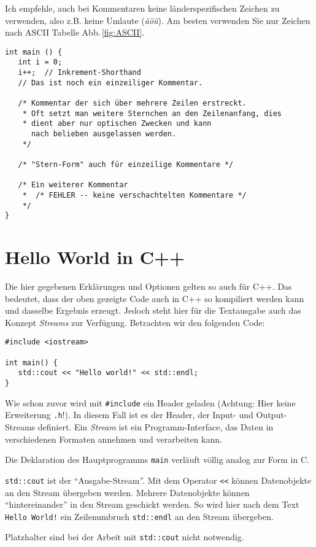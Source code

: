 Ich empfehle, auch bei Kommentaren keine länderspezifischen Zeichen zu verwenden, also z.B. keine Umlaute (\emph{äöü}). Am besten verwenden Sie nur Zeichen nach ASCII Tabelle Abb.\,\ref{fig:ASCII}.

\begin{codebox}
\begin{verbatim}
int main () {
   int i = 0;
   i++;  // Inkrement-Shorthand
   // Das ist noch ein einzeiliger Kommentar.

   /* Kommentar der sich über mehrere Zeilen erstreckt.
    * Oft setzt man weitere Sternchen an den Zeilenanfang, dies
    * dient aber nur optischen Zwecken und kann
      nach belieben ausgelassen werden.
    */

   /* "Stern-Form" auch für einzeilige Kommentare */

   /* Ein weiterer Kommentar
    *  /* FEHLER -- keine verschachtelten Kommentare */
    */
}
\end{verbatim}
\end{codebox}

\section{Hello World in C++}
\begin{plusbox}
Die hier gegebenen Erklärungen und Optionen gelten so auch für C++. Das bedeutet, dass der oben gezeigte Code auch in C++ so kompiliert werden kann und dasselbe Ergebnis erzeugt. Jedoch steht hier für die Textausgabe auch das Konzept \emph{Streams} zur Verfügung. Betrachten wir den folgenden Code:

\begin{codebox}
\begin{verbatim}
#include <iostream>

int main() {
   std::cout << "Hello world!" << std::endl;
}
\end{verbatim}
\end{codebox}

Wie schon zuvor wird mit \texttt{#include} ein Header geladen (Achtung: Hier keine Erweiterung \texttt{.h}!). In diesem Fall ist es der Header, der Input- und Output-Streams definiert. Ein \emph{Stream} ist ein Programm-Interface, das Daten in verschiedenen Formaten annehmen und verarbeiten kann.

Die Deklaration des Hauptprogramms \texttt{main} verläuft völlig analog zur Form in C.

\texttt{std::cout} ist der \enquote{Ausgabe-Stream}. Mit dem Operator \texttt{<{}<} können Datenobjekte an den Stream übergeben werden. Mehrere Datenobjekte können \enquote{hintereinander} in den Stream geschickt werden. So wird hier nach dem Text \texttt{Hello World!} ein Zeilenumbruch \texttt{std::endl} an den Stream übergeben.

Platzhalter sind bei der Arbeit mit \texttt{std::cout} nicht notwendig.
\end{plusbox}

